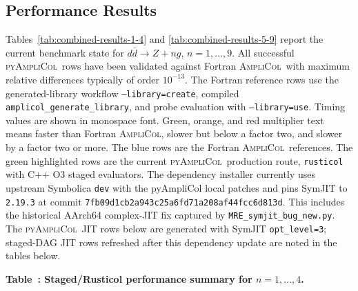 \documentclass[10pt]{article}
\newcommand{\AC}{\textsc{AmpliCol}}
\newcommand{\PAC}{\textsc{pyAmpliCol}}
\begin{document}
\begin{landscape}
\section{Performance Results}

Tables~\ref{tab:combined-results-1-4} and
\ref{tab:combined-results-5-9}
report the current benchmark state for \(d\bar d\to Z+n g\),
\(n=1,\ldots,9\).  All successful \PAC\ rows have been validated against
Fortran \AC\ with maximum relative differences typically of order \(10^{-13}\).
The Fortran reference rows use the generated-library workflow
\texttt{--library=create}, compiled \texttt{amplicol\_generate\_library}, and
probe evaluation with \texttt{--library=use}.  Timing values are shown in
monospace font.  Green, orange, and red multiplier text means faster than
Fortran \AC, slower but below a factor two, and slower by a factor two or more.
The blue rows are the Fortran \AC\ references.  The green highlighted rows are
the current \PAC\ production route, \texttt{rusticol} with C++ O3 staged
evaluators.
The dependency installer currently uses upstream Symbolica \texttt{dev} with
the pyAmpliCol local patches and pins SymJIT to \texttt{2.19.3} at commit
\texttt{7fb09d1cb2a943c25a6fd71a208af44fcc6d813d}.  This includes the
historical AArch64 complex-JIT fix captured by
\texttt{MRE\_symjit\_bug\_new.py}.  The \PAC\ JIT rows below are generated
with SymJIT \texttt{opt\_level=3}; staged-DAG JIT rows refreshed after this
dependency update are noted in the tables below.

\scriptsize
\setlength{\tabcolsep}{1.55pt}
\renewcommand{\arraystretch}{1.12}
\newcommand{\perfheader}{%
\toprule
\textbf{n} & \textbf{route} & \textbf{setup} & \textbf{gen [s]} & \textbf{wall [us/pt]} & \textbf{eval [us/pt]} & \textbf{notes} \\
\midrule}
\begin{center}
\label{tab:combined-results-1-4}
\textbf{Table~\thetable: Staged/Rusticol performance summary for \(n=1,\ldots,4\).}
\vspace{0.35em}


\end{center}
\end{landscape}
\end{document}
